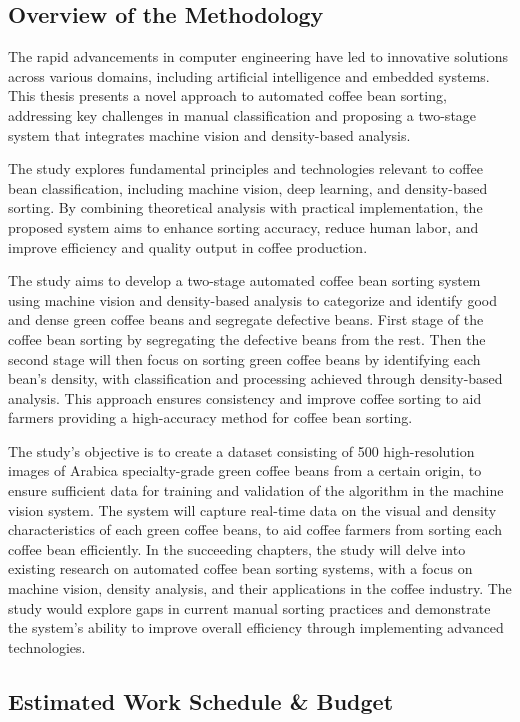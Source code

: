 \subsection{Overview of the Methodology}

The rapid advancements in computer engineering have led to innovative solutions across various domains, including artificial intelligence and embedded systems. This thesis presents a novel approach to automated coffee bean sorting, addressing key challenges in manual classification and proposing a two-stage system that integrates machine vision and density-based analysis.

The study explores fundamental principles and technologies relevant to coffee bean classification, including machine vision, deep learning, and density-based sorting. By combining theoretical analysis with practical implementation, the proposed system aims to enhance sorting accuracy, reduce human labor, and improve efficiency and quality output in coffee production. 

The study aims to develop a two-stage automated coffee bean sorting system using machine vision and density-based analysis to categorize and identify good and dense green coffee beans and segregate defective beans. First stage of the coffee bean sorting by segregating the defective beans from the rest. Then the second stage will then focus on sorting green coffee beans by identifying each bean’s density, with classification and processing achieved through density-based analysis. This approach ensures consistency and improve coffee sorting to aid farmers providing a high-accuracy method for coffee bean sorting.

The study’s objective is to create a dataset consisting of 500 high-resolution images of Arabica specialty-grade green coffee beans from a certain origin, to ensure sufficient data for training and validation of the algorithm in the machine vision system. The system will capture real-time data on the visual and density characteristics of each green coffee beans, to aid coffee farmers from sorting each coffee bean efficiently. In the succeeding chapters, the study will delve into existing research on automated coffee bean sorting systems, with a focus on machine vision, density analysis, and their applications in the coffee industry. The study would explore gaps in current manual sorting practices and demonstrate the system’s ability to improve overall efficiency through implementing advanced technologies.


\subsection{Estimated Work Schedule \& Budget}

